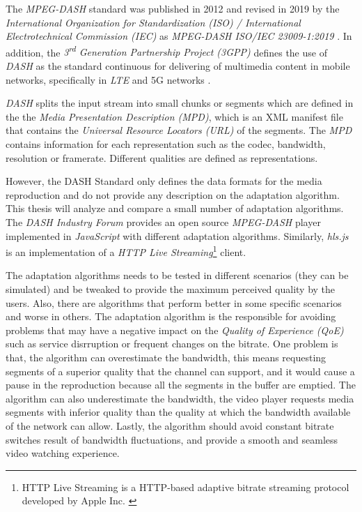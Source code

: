   
The \textit{MPEG-DASH} standard was published in 2012 and revised in 2019 
by the \textit{International Organization for Standardization (ISO) / International 
Electrotechnical Commission (IEC)} as \textit{MPEG-DASH ISO/IEC 23009-1:2019}
\cite{ISO23009}. In addition, the \textit{3\textsuperscript{rd} Generation Partnership Project (3GPP)}
defines the use of \textit{DASH} as the standard continuous for delivering of multimedia
content in mobile networks, specifically in \textit{LTE} and 5G networks \cite{3gpp1}.

\textit{DASH} splits the input stream into small chunks or segments
which are defined in the the \textit{Media Presentation Description (MPD)}, 
which is an XML manifest file that contains the \textit{Universal Resource 
Locators (URL)} of the segments. The \textit{MPD} contains information for each 
representation such as the codec, bandwidth, resolution or framerate.
Different qualities are defined as representations.

However, the DASH Standard \cite{ISO23009} only defines the data formats
for the media reproduction and do not provide any description on the adaptation algorithm.
This thesis will analyze and compare a small number of adaptation algorithms.
The \textit{DASH Industry Forum} \cite{dash2} provides an open source \textit{MPEG-DASH} 
player implemented in \textit{JavaScript} with different adaptation algorithms.
Similarly, \textit{hls.js} is an implementation of a \textit{HTTP Live Streaming}\footnote{HTTP
Live Streaming is a HTTP-based adaptive bitrate streaming protocol developed by Apple Inc.
 \cite{hls1}} client.

The adaptation algorithms needs to be tested in different scenarios (they can be simulated)
and be tweaked to provide the maximum perceived quality by the users. Also, there are
algorithms that perform better in some specific scenarios and worse in others. The adaptation
algorithm is the responsible for avoiding problems that may have a negative impact
on the \textit{Quality of Experience (QoE)} such as service disrruption or
frequent changes on the bitrate. 
One problem is that, the algorithm can overestimate
the bandwidth, this means requesting segments of a superior quality that the channel can support,
and it would cause a pause in the reproduction because all the 
segments in the buffer are emptied. The algorithm can also underestimate the bandwidth,
the video player requests media segments with inferior quality than the quality at which the 
bandwidth available of the network can allow. Lastly, the algorithm should avoid
constant bitrate switches result of bandwidth fluctuations, and provide a smooth and
seamless video watching experience.

